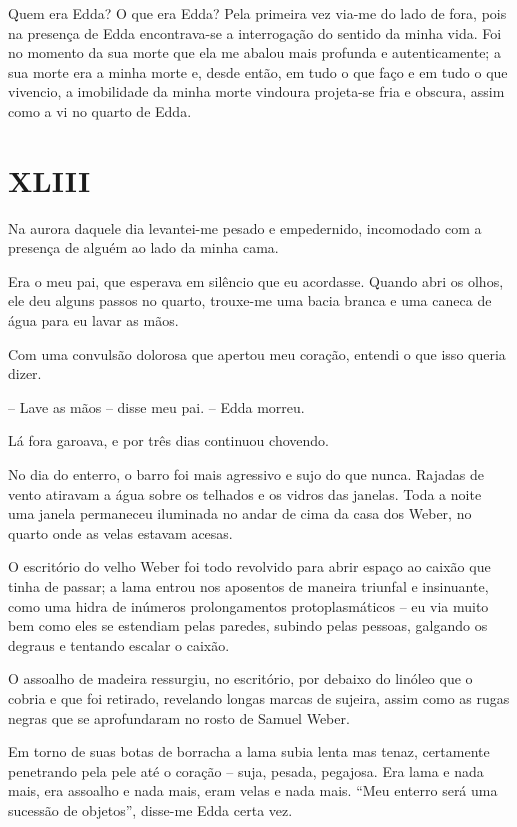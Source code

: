 Quem era Edda? O que era Edda? Pela primeira vez via-me do lado de fora, pois na presença de Edda encontrava-se a interrogação do sentido da minha vida. Foi no momento da sua morte que ela me abalou mais profunda e autenticamente; a sua morte era a minha morte e, desde então, em tudo o que faço e em tudo o que vivencio, a imobilidade da minha morte vindoura projeta-se fria e obscura, assim como a vi no quarto de Edda.


\chapter*{\centering\Large{XLIII}}

Na aurora daquele dia levantei-me pesado e empedernido, incomodado com a presença de alguém ao lado da minha cama.

Era o meu pai, que esperava em silêncio que eu acordasse. Quando abri os olhos, ele deu alguns passos no quarto, trouxe-me uma bacia branca e uma caneca de água para eu lavar as mãos.

Com uma convulsão dolorosa que apertou meu coração, entendi o que isso queria dizer.

-- Lave as mãos -- disse meu pai. -- Edda morreu.

Lá fora garoava, e por três dias continuou chovendo.

No dia do enterro, o barro foi mais agressivo e sujo do que nunca. Rajadas de vento atiravam a água sobre os telhados e os vidros das janelas. Toda a noite uma janela permaneceu iluminada no andar de cima da casa dos Weber, no quarto onde as velas estavam acesas.

O escritório do velho Weber foi todo revolvido para abrir espaço ao caixão que tinha de passar; a lama entrou nos aposentos de maneira triunfal e insinuante, como uma hidra de inúmeros prolongamentos protoplasmáticos -- eu via muito bem como eles se estendiam pelas paredes, subindo pelas pessoas, galgando os degraus e tentando escalar o caixão.

O assoalho de madeira ressurgiu, no escritório, por debaixo do linóleo que o cobria e que foi retirado, revelando longas marcas de sujeira, assim como as rugas negras que se aprofundaram no rosto de Samuel Weber.

Em torno de suas botas de borracha a lama subia lenta mas tenaz, certamente penetrando pela pele até o coração -- suja, pesada, pegajosa. Era lama e nada mais, era assoalho e nada mais, eram velas e nada mais. ``Meu enterro será uma sucessão de objetos'', disse-me Edda certa vez.

